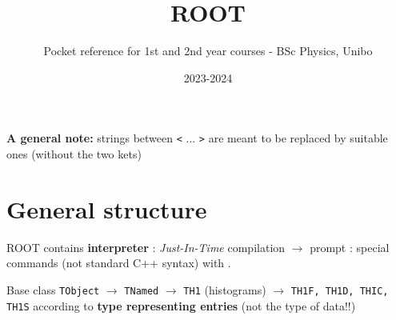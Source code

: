 \documentclass[10pt, twoside]{article}
\title{ROOT}
\author{Pocket reference for 1st and 2nd year courses - BSc Physics, Unibo}
\date{2023-2024}
\newcommand{\ttt}[1]{\colorbox{boxgray}{\texttt{#1}}}
\begin{document}
\maketitle
{\small\tableofcontents}
\hfill
\begin{center}
\textbf{A general note:} strings between \ttt{<} ... \ttt{>} are meant to be replaced by suitable ones (without the two kets)
\end{center}
\hfill

\section{General structure}

ROOT contains \textbf{interpreter} : \textit{Just-In-Time} compilation $\rightarrow$ prompt : special commands (not standard C++ syntax) with .

Base class \ttt{TObject} $\rightarrow$ \ttt{TNamed} $\rightarrow$ \ttt{TH1} (histograms) $\rightarrow$ \ttt{TH1F, TH1D, THIC, TH1S} according to \textbf{type representing entries} (not the type of data!!)
\end{document}
